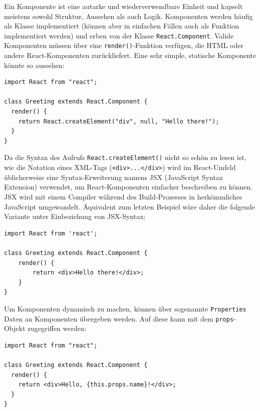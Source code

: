 Ein Komponente ist eine autarke und wiederverwendbare Einheit und kapselt meistens sowohl Struktur, Aussehen als auch Logik. Komponenten werden häufig als Klasse implementiert (können aber in einfachen Fällen auch als Funktion implementiert werden) und erben von der Klasse \texttt{React.Component}. Valide Komponenten müssen über eine \texttt{render()}-Funktion verfügen, die HTML oder andere React-Komponenten zurückliefert. Eine sehr simple, statische Komponente könnte so aussehen:

\begin{minipage}{\linewidth}
\begin{lstlisting}[caption={Einfache React-Komponente ohne JSX-Syntax.}]
import React from "react";

class Greeting extends React.Component {
  render() {
    return React.createElement("div", null, "Hello there!");
  }
}
\end{lstlisting}
\end{minipage}

Da die Syntax des Aufrufs \texttt{React.createElement()} nicht so schön zu lesen ist, wie die Notation eines XML-Tags (\texttt{<div>...</div>}) wird im React-Umfeld üblicherweise eine Syntax-Erweiterung namens JSX (JavaScript Syntax Extension) verwendet, um React-Komponenten einfacher beschreiben zu können. JSX wird mit einem Compiler während des Build-Prozesses in herkömmliches JavaScript umgewandelt. Äquivalent zum letzten Beispiel wäre daher die folgende Variante unter Einbeziehung von JSX-Syntax:

\begin{minipage}{\linewidth}
\begin{lstlisting}[caption={Einfache React-Komponente mit JSX-Syntax.}]
import React from 'react';

class Greeting extends React.Component {
    render() {
        return <div>Hello there!</div>;
    }
}
\end{lstlisting}
\end{minipage}

Um Komponenten dynamisch zu machen, können über sogenannte \texttt{Properties} Daten an Komponenten übergeben werden. Auf diese kann mit dem \texttt{props}-Objekt zugegriffen werden:

\begin{minipage}{\linewidth}
\begin{lstlisting}[caption={Komponenten erhalten Daten über ihre Properties.}]
import React from "react";

class Greeting extends React.Component {
  render() {
    return <div>Hello, {this.props.name}!</div>;
  }
}
\end{lstlisting}
\end{minipage}

